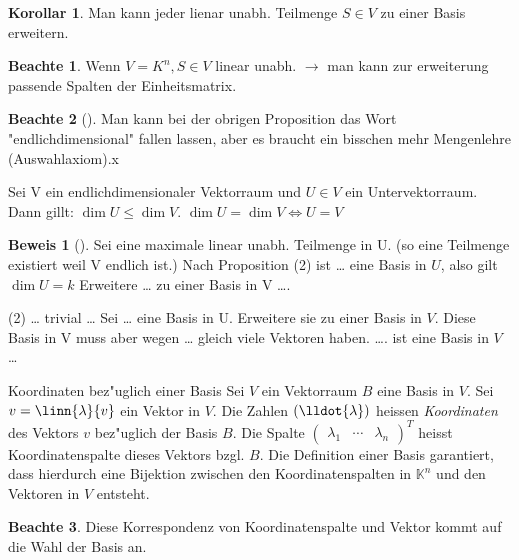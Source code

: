 \documentclass[oneside,fontsize=11pt,paper=a4,BCOR=0mm,DIV=12,automark,headsepline]{scrbook}
\theoremstyle{remark}
\theoremstyle{definition}
\newtheorem*{notte}{Beachte}
\newtheorem*{korollar}{Korollar}
\theoremstyle{definition}
\newtheorem*{prof}{Beweis}
\theoremstyle{remark}
\begin{document}
\begin{korollar}
  Man kann jeder lienar unabh. Teilmenge \(S\in V\) zu einer Basis
  erweitern.
\end{korollar}

\begin{notte}
  Wenn \(V=K^n, S\in V\) linear unabh. \(\rightarrow\) man kann zur erweiterung passende
  Spalten der Einheitsmatrix.
\end{notte}

\begin{notte}[]
  Man kann bei der obrigen Proposition das Wort "endlichdimensional" fallen
  lassen, aber es braucht ein bisschen mehr Mengenlehre (Auswahlaxiom).x
\end{notte}
\begin{theo}{}{}
  Sei V ein endlichdimensionaler Vektorraum und \(U\in V\) ein Untervektorraum. Dann
  gillt: \(\dim U \leq \dim V\).  \(\dim U = \dim V \iff U=V\)
\end{theo}

\begin{prof}[]
  Sei eine maximale linear unabh. Teilmenge in U. (so eine Teilmenge existiert
  weil V endlich ist.)
  Nach Proposition (2) ist \ldots{} eine Basis in \(U\), also gilt \(\dim U = k\) Erweitere
  \ldots{} zu einer Basis in V \ldots{}. 

  (2) \ldots{} trivial \ldots{} Sei \ldots{} eine Basis in U. Erweitere sie zu einer Basis in
  \(V\). Diese Basis in V muss aber wegen \ldots{} gleich viele Vektoren haben. \ldots{}. ist
  eine Basis in \(V\) \ldots{}
\end{prof}


\begin{definition}{Koordinaten bez"uglich einer Basis}{}
  Sei \(V\) ein Vektorraum $B$ eine Basis in $V$. Sei
  $v=\linn{\lambda}{v}$ ein Vektor in $V$. Die Zahlen
  \((\lldot{\lambda})\) heissen \emph{Koordinaten} des Vektors $v$ bez"uglich
  der Basis $B$. Die Spalte
  $\begin{pmatrix}
    \lambda_1
    & \cdots
    & \lambda_n
  \end{pmatrix}^T$ heisst Koordinatenspalte dieses Vektors
  bzgl. \(B\).  Die Definition einer Basis garantiert, dass hierdurch
  eine Bijektion zwischen den Koordinatenspalten in $\mathbb{K}^n$ und
  den Vektoren in $V$ entsteht.
\end{definition}

\begin{notte}
  Diese Korrespondenz von Koordinatenspalte und Vektor kommt auf die
  Wahl der Basis an.
\end{notte}
\end{document}
